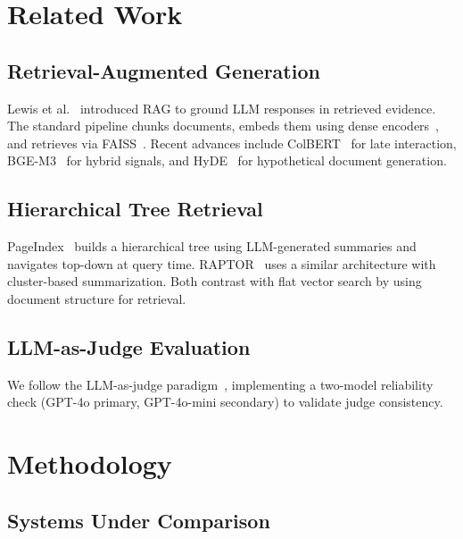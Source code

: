 \documentclass[journal]{IEEEtran}
\begin{document}
\section{Related Work}
\label{sec:related}

\subsection{Retrieval-Augmented Generation}
Lewis et al.~\cite{rag} introduced RAG to ground LLM responses in retrieved evidence. The standard pipeline chunks documents, embeds them using dense encoders~\cite{sbert}, and retrieves via FAISS~\cite{faiss}. Recent advances include ColBERT~\cite{colbert} for late interaction, BGE-M3~\cite{bgem3} for hybrid signals, and HyDE~\cite{hyde} for hypothetical document generation.

\subsection{Hierarchical Tree Retrieval}
PageIndex~\cite{pageindex} builds a hierarchical tree using LLM-generated summaries and navigates top-down at query time. RAPTOR~\cite{raptor} uses a similar architecture with cluster-based summarization. Both contrast with flat vector search by using document structure for retrieval.

\subsection{LLM-as-Judge Evaluation}
We follow the LLM-as-judge paradigm~\cite{mtbench}, implementing a two-model reliability check (GPT-4o primary, GPT-4o-mini secondary) to validate judge consistency.


\section{Methodology}
\label{sec:method}

\subsection{Systems Under Comparison}

\begin{table}[!ht]
\caption{System comparison. Within each domain, both systems use the same generation LLM.}
\label{tab:systems}
\centering
{}
\end{table}
\end{document}
